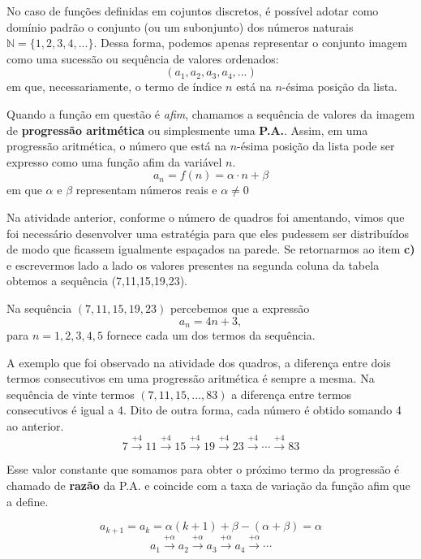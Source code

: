 No caso de funções definidas em cojuntos discretos, é possível adotar como domínio padrão o conjunto (ou um subonjunto) dos números naturais $\mathbb{N}=\{1,2,3,4,...\}$. Dessa forma, podemos apenas representar o conjunto imagem como uma sucessão ou sequência de valores ordenados: 
\begin{equation*}
(a_1, a_2,a_3,a_4,...)
\end{equation*}
em que, necessariamente, o termo de índice $n$ está na $n$-ésima posição da lista.

Quando a função em questão é \textit{afim}, chamamos a sequência de valores da imagem de \textbf{progressão aritmética} ou simplesmente uma \textbf{P.A.}. Assim, em uma progressão aritmética, o número que está na $n$-ésima posição da lista pode ser expresso como uma função afim da variável $n$.
\begin{equation*}
a_n=f(n)=\alpha\cdot n+\beta
\end{equation*}
em que $\alpha$ e $\beta$ representam números reais e $\alpha\neq0$

Na atividade anterior, conforme o número de quadros foi amentando, vimos que foi necessário desenvolver uma estratégia para que eles pudessem ser distribuídos de modo que ficassem igualmente espaçados na parede. Se retornarmos ao item \textbf{\textcolor{session1}{c})} e escrevermos lado a lado os valores presentes na segunda coluna da tabela obtemos a sequência (7,11,15,19,23).

Na sequência $(7,11,15,19,23)$ percebemos que a expressão
\begin{equation*}
a_n=4n+3,
\end{equation*}
para $n=1,2,3,4,5$ fornece cada um dos termos da sequência.

A exemplo que foi observado na atividade dos quadros, a diferença entre dois termos consecutivos em uma progressão aritmética é sempre a mesma. Na sequência de vinte termos $(7,11,15,...,83)$ a diferença entre termos consecutivos é igual a 4. Dito de outra forma, cada número é obtido somando 4 ao anterior.
\begin{equation*}
7\xrightarrow{+4} 11 \xrightarrow{+4} 15 \xrightarrow{+4} 19 \xrightarrow{+4} 23 \xrightarrow{+4} \cdots \xrightarrow{+4} 83
\end{equation*}

Esse valor constante que somamos para obter o próximo termo da progressão é chamado de \textbf{razão} da P.A. e coincide com a taxa de variação da função afim que a define.

\begin{equation*}
a_{k+1}=a_k=\alpha(k+1)+\beta-(\alpha+\beta)=\alpha
\end{equation*}
\begin{equation*}
a_1 \xrightarrow{+\alpha} a_2 \xrightarrow{+\alpha} a_3 \xrightarrow{+\alpha} a_4 \xrightarrow{+\alpha}\cdots   
\end{equation*}

